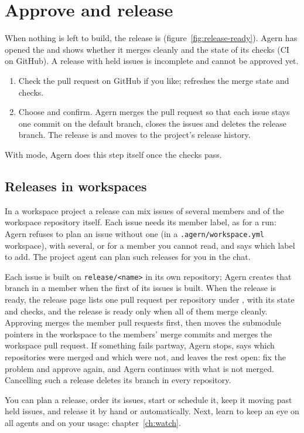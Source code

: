 
\section{Approve and release}\label{sec:approve-release}

When nothing is left to build, the release is  (figure~\ref{fig:release-ready}).
Agern has opened the  and shows whether it merges cleanly and the state of
its checks (CI on GitHub). A release with held issues is incomplete and cannot be approved yet.

\begin{enumerate}
  \item Check the pull request on GitHub if you like;  refreshes the merge state
    and checks.
  \item Choose  and confirm. Agern merges the pull request so that each
    issue stays one commit on the default branch, closes the issues and deletes the release branch.
    The release is  and moves to the project's release history.
\end{enumerate}

With  mode, Agern does this step itself once the checks pass.


\subsection{Releases in workspaces}\label{sec:workspace-releases}

In a workspace project a release can mix issues of several members and of the workspace repository
itself. Each issue needs its member label, as for a run: Agern refuses to plan an issue without
one (in a \texttt{.agern/workspace.yml} workspace), with several, or for a member you cannot read,
and says which label to add. The project agent can plan such releases for you in the chat.

Each issue is built on \texttt{release/<name>} in its own repository; Agern creates that branch in a
member when the first of its issues is built. When the release is ready, the release page lists
one pull request per repository under , with its state and checks, and the
release is ready only when all of them merge cleanly. Approving merges the member pull requests
first, then moves the submodule pointers in the workspace to the members' merge commits and merges
the workspace pull request. If something fails partway, Agern stops, says which repositories were
merged and which were not, and leaves the rest open: fix the problem and approve again, and Agern
continues with what is not merged. Cancelling such a release deletes its branch in every
repository.

\whatyouhave
You can plan a release, order its issues, start or schedule it, keep it moving past held issues,
and release it by hand or automatically. Next, learn to keep an eye on all agents and on your
usage: chapter~\ref{ch:watch}.
